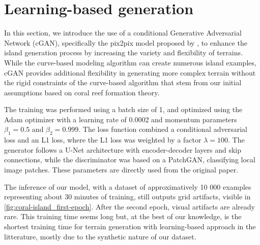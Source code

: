 \section{Learning-based generation}
\label{sec:coral-island_learning-based}


In this section, we introduce the use of a conditional Generative Adversarial Network (cGAN), specifically the pix2pix model proposed by \cite{Isola2017}, to enhance the island generation process by increasing the variety and flexibility of terrains. While the curve-based modeling algorithm can create numerous island examples, cGAN provides additional flexibility in generating more complex terrain without the rigid constraints of the curve-based algorithm that stem from our initial assumptions based on coral reef formation theory. 

% 

The training was performed using a batch size of 1, and optimized using the Adam optimizer with a learning rate of 0.0002 and momentum parameters $\beta_1 = 0.5$ and $\beta_2 = 0.999$. The loss function combined a conditional adversarial loss and an L1 loss, where the L1 loss was weighted by a factor $\lambda = 100$. The generator follows a U-Net architecture with encoder-decoder layers and skip connections, while the discriminator was based on a PatchGAN, classifying local image patches. These parameters are directly used from the original paper.

The inference of our model, with a dataset of approximatively 10 000 examples representing about 30 minutes of training, still outputs grid artifacts, visible in \cref{fig:coral-island_first-epoch}. After the second epoch, visual artifacts are already rare. This training time seems long but, at the best of our knowledge, is the shortest training time for terrain generation with learning-based approach in the litterature, mostly due to the synthetic nature of our dataset.

